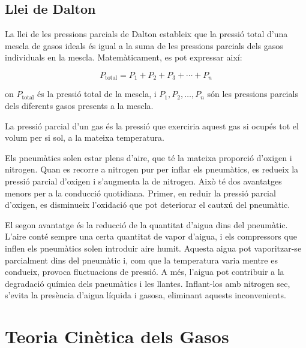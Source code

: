 %
%

\subsection{Llei de Dalton}
La llei de les pressions parcials de Dalton estableix que la pressió total d'una mescla de gasos ideals és igual a la suma de les pressions parcials dels gasos individuals en la mescla. Matemàticament, es pot expressar així:

\[
P_{\text{total}} = P_1 + P_2 + P_3 + \cdots + P_n
\]

on \(P_{\text{total}}\) és la pressió total de la mescla, i \(P_1, P_2, \dots, P_n\) són les pressions parcials dels diferents gasos presents a la mescla.

La pressió parcial d'un gas és la pressió que exerciria aquest gas si ocupés tot el volum per si sol, a la mateixa temperatura.
  
%

\begin{mybox}[title=Nitrogen als pneumàtics?] 
  Els pneumàtics solen estar plens d’aire, que té la mateixa proporció d’oxigen i nitrogen. Quan es recorre a nitrogen pur per inflar els pneumàtics, es redueix la pressió parcial d’oxigen i s’augmenta la de nitrogen. Això té dos avantatges menors per a la conducció quotidiana. Primer, en reduir la pressió parcial d’oxigen, es disminueix l’oxidació que pot deteriorar el cautxú del pneumàtic.

El segon avantatge és la reducció de la quantitat d’aigua dins del pneumàtic. L’aire conté sempre una certa quantitat de vapor d’aigua, i els compressors que inflen els pneumàtics solen introduir aire humit. Aquesta aigua pot vaporitzar-se parcialment dins del pneumàtic i, com que la temperatura varia mentre es condueix, provoca fluctuacions de pressió. A més, l’aigua pot contribuir a la degradació química dels pneumàtics i les llantes. Inflant-los amb nitrogen sec, s’evita la presència d’aigua líquida i gasosa, eliminant aquests inconvenients.
\end{mybox}

\section{Teoria Cinètica dels Gasos}

